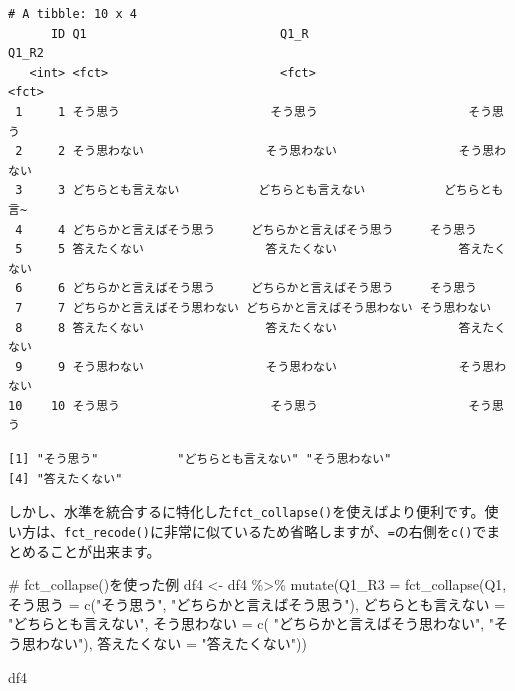 \documentclass[
  a4paper,
  pandoc,
  ja=standard,
  jafont=haranoaji]{bxjsbook}
\newenvironment{Shaded}{\begin{snugshade}}{\end{snugshade}}
\newcommand{\AttributeTok}[1]{\textcolor[rgb]{0.00,0.48,0.65}{#1}}
\newcommand{\CommentTok}[1]{\textcolor[rgb]{0.37,0.37,0.37}{#1}}
\newcommand{\FunctionTok}[1]{\textcolor[rgb]{0.28,0.35,0.67}{#1}}
\newcommand{\NormalTok}[1]{\textcolor[rgb]{0.00,0.48,0.65}{#1}}
\newcommand{\OtherTok}[1]{\textcolor[rgb]{0.00,0.48,0.65}{#1}}
\newcommand{\SpecialCharTok}[1]{\textcolor[rgb]{0.37,0.37,0.37}{#1}}
\newcommand{\StringTok}[1]{\textcolor[rgb]{0.13,0.47,0.30}{#1}}
\begin{document}
\begin{verbatim}
# A tibble: 10 x 4
      ID Q1                           Q1_R                         Q1_R2        
   <int> <fct>                        <fct>                        <fct>        
 1     1 そう思う                     そう思う                     そう思う     
 2     2 そう思わない                 そう思わない                 そう思わない 
 3     3 どちらとも言えない           どちらとも言えない           どちらとも言~
 4     4 どちらかと言えばそう思う     どちらかと言えばそう思う     そう思う     
 5     5 答えたくない                 答えたくない                 答えたくない 
 6     6 どちらかと言えばそう思う     どちらかと言えばそう思う     そう思う     
 7     7 どちらかと言えばそう思わない どちらかと言えばそう思わない そう思わない 
 8     8 答えたくない                 答えたくない                 答えたくない 
 9     9 そう思わない                 そう思わない                 そう思わない 
10    10 そう思う                     そう思う                     そう思う     
\end{verbatim}

\begin{Shaded}
\end{Shaded}

\begin{verbatim}
[1] "そう思う"           "どちらとも言えない" "そう思わない"      
[4] "答えたくない"      
\end{verbatim}

しかし、水準を統合するに特化した\texttt{fct\_collapse()}を使えばより便利です。使い方は、\texttt{fct\_recode()}に非常に似ているため省略しますが、\texttt{=}の右側を\texttt{c()}でまとめることが出来ます。

\begin{Shaded}
\begin{Highlighting}[numbers=left,,]
\CommentTok{\# fct\_collapse()を使った例}
\NormalTok{df4 }\OtherTok{\textless{}{-}}\NormalTok{ df4 }\SpecialCharTok{\%\textgreater{}\%} 
    \FunctionTok{mutate}\NormalTok{(}\AttributeTok{Q1\_R3 =} \FunctionTok{fct\_collapse}\NormalTok{(Q1,}
\NormalTok{                                そう思う }\OtherTok{=} \FunctionTok{c}\NormalTok{(}\StringTok{"そう思う"}\NormalTok{, }\StringTok{"どちらかと言えばそう思う"}\NormalTok{),}
\NormalTok{                                どちらとも言えない }\OtherTok{=} \StringTok{"どちらとも言えない"}\NormalTok{,}
\NormalTok{                                そう思わない }\OtherTok{=} \FunctionTok{c}\NormalTok{( }\StringTok{"どちらかと言えばそう思わない"}\NormalTok{, }\StringTok{"そう思わない"}\NormalTok{),}
\NormalTok{                                答えたくない }\OtherTok{=} \StringTok{"答えたくない"}\NormalTok{))}

\NormalTok{df4}
\end{Highlighting}
\end{Shaded}
\end{document}
